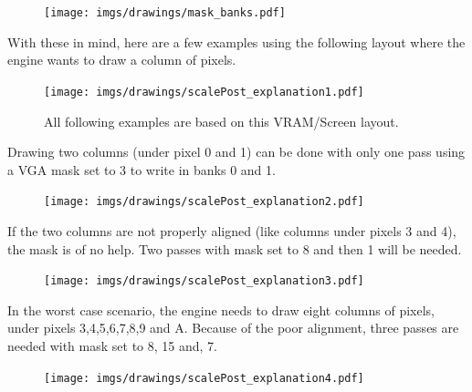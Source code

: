 \begin{figure}[H]
\centering
 \texttt{[image: imgs/drawings/mask\_banks.pdf]}
 \end{figure}


With these in mind, here are a few examples using the following layout where the engine wants to draw a column of pixels.
\begin{figure}[H]
\centering
 \texttt{[image: imgs/drawings/scalePost\_explanation1.pdf]}
 \caption{All following examples are based on this VRAM/Screen layout.}
 \end{figure}


 Drawing two columns (under pixel 0 and 1) can be done with only one pass using a VGA mask set to 3 to write in banks 0 and 1.\\
 \par
 \begin{minipage}{\textwidth}

\end{minipage}
\par

 \begin{figure}[H]
 \centering
 \texttt{[image: imgs/drawings/scalePost\_explanation2.pdf]}
 \end{figure}




\label{simd_vga}
If the two columns are not properly aligned (like columns under pixels 3 and 4), the mask is of no help. Two passes with mask set to 8 and then 1 will be needed.\\
 \par
 \begin{minipage}{\textwidth}

\end{minipage}
\par
  \begin{figure}[H]
 \centering
 \texttt{[image: imgs/drawings/scalePost\_explanation3.pdf]}
 \end{figure}


In the worst case scenario, the engine needs to draw eight columns of pixels, under pixels 3,4,5,6,7,8,9 and A. Because of the poor alignment, three passes are needed with mask set to 8, 15 and, 7.\\
 \par
 \begin{minipage}{\textwidth}

\end{minipage}
\par
  \begin{figure}[H]
 \centering
 \texttt{[image: imgs/drawings/scalePost\_explanation4.pdf]}
 \end{figure}


